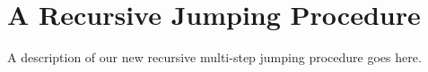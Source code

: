 \section{A Recursive Jumping Procedure}
A description of our new recursive multi-step jumping procedure goes here.
